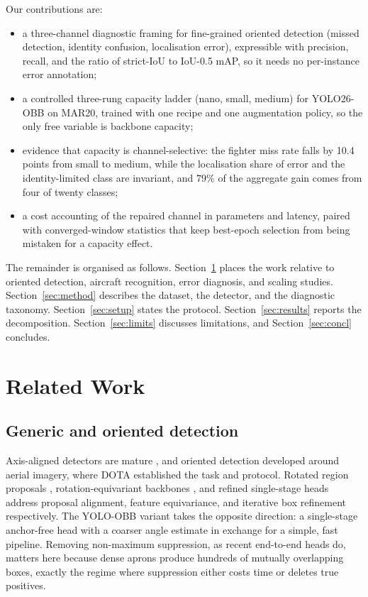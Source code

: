 \documentclass[conference]{IEEEtran}
\begin{document}
Our contributions are:
\begin{itemize}
\item a three-channel diagnostic framing for fine-grained oriented detection
(missed detection, identity confusion, localisation error), expressible with
precision, recall, and the ratio of strict-IoU to IoU-0.5 mAP, so it needs no
per-instance error annotation;
\item a controlled three-rung capacity ladder (nano, small, medium) for
YOLO26-OBB on MAR20, trained with one recipe and one augmentation policy, so the
only free variable is backbone capacity;
\item evidence that capacity is channel-selective: the fighter miss rate falls by
10.4 points from small to medium, while the localisation share of error and the
identity-limited class are invariant, and $79\%$ of the aggregate gain comes from
four of twenty classes;
\item a cost accounting of the repaired channel in parameters and latency, paired
with converged-window statistics that keep best-epoch selection from being
mistaken for a capacity effect.
\end{itemize}

The remainder is organised as follows. Section~\ref{sec:related} places the work
relative to oriented detection, aircraft recognition, error diagnosis, and
scaling studies. Section~\ref{sec:method} describes the dataset, the detector,
and the diagnostic taxonomy. Section~\ref{sec:setup} states the protocol.
Section~\ref{sec:results} reports the decomposition. Section~\ref{sec:limits}
discusses limitations, and Section~\ref{sec:concl} concludes.

\section{Related Work}
\label{sec:related}

\subsection{Generic and oriented detection}
Axis-aligned detectors are mature
\cite{redmon2016,lin2017focal,tian2019fcos,zhou2019objects}, and oriented
detection developed around aerial imagery, where DOTA \cite{xia2018dota}
established the task and protocol. Rotated region proposals
\cite{ding2019roitransformer}, rotation-equivariant backbones \cite{han2021redet},
and refined single-stage heads \cite{yang2021r3det} address proposal alignment,
feature equivariance, and iterative box refinement respectively. The YOLO-OBB
variant takes the opposite direction: a single-stage anchor-free head with a
coarser angle estimate in exchange for a simple, fast pipeline. Removing
non-maximum suppression, as recent end-to-end heads do, matters here because
dense aprons produce hundreds of mutually overlapping boxes, exactly the regime
where suppression either costs time or deletes true positives.
\end{document}
